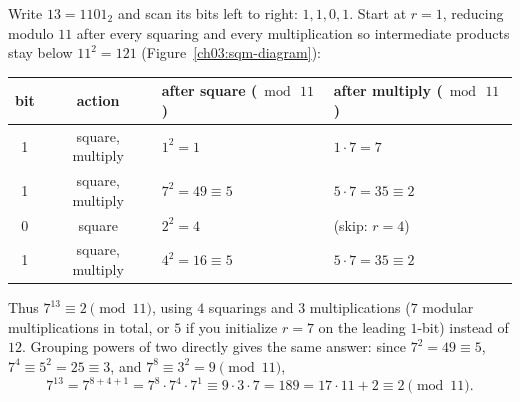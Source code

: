 \begin{example}
\label{ch03:sqm-example}
Write $13 = 1101_2$ and scan its bits left to right: $1, 1, 0, 1$. Start at $r = 1$, reducing modulo $11$ after every squaring and every multiplication so intermediate products stay below $11^2 = 121$ (Figure~\ref{ch03:sqm-diagram}):

\begin{center}
\begin{tabular}{c c l l}
\toprule
bit & action & after square ($\bmod\,11$) & after multiply ($\bmod\,11$) \\
\midrule
1 & square, multiply & $1^2 = 1$             & $1 \cdot 7 = 7$ \\
1 & square, multiply & $7^2 = 49 \equiv 5$   & $5 \cdot 7 = 35 \equiv 2$ \\
0 & square           & $2^2 = 4$             & (skip: $r = 4$) \\
1 & square, multiply & $4^2 = 16 \equiv 5$   & $5 \cdot 7 = 35 \equiv 2$ \\
\bottomrule
\end{tabular}
\end{center}

Thus $7^{13} \equiv 2 \pmod{11}$, using $4$ squarings and $3$ multiplications ($7$ modular multiplications in total, or $5$ if you initialize $r = 7$ on the leading $1$-bit) instead of $12$. Grouping powers of two directly gives the same answer: since $7^2 = 49 \equiv 5$, $7^4 \equiv 5^2 = 25 \equiv 3$, and $7^8 \equiv 3^2 = 9 \pmod{11}$,
\[
  7^{13} = 7^{8 + 4 + 1} = 7^8 \cdot 7^4 \cdot 7^1 \equiv 9 \cdot 3 \cdot 7 = 189 = 17\cdot 11 + 2 \equiv 2 \pmod{11}.
\]
\end{example}

